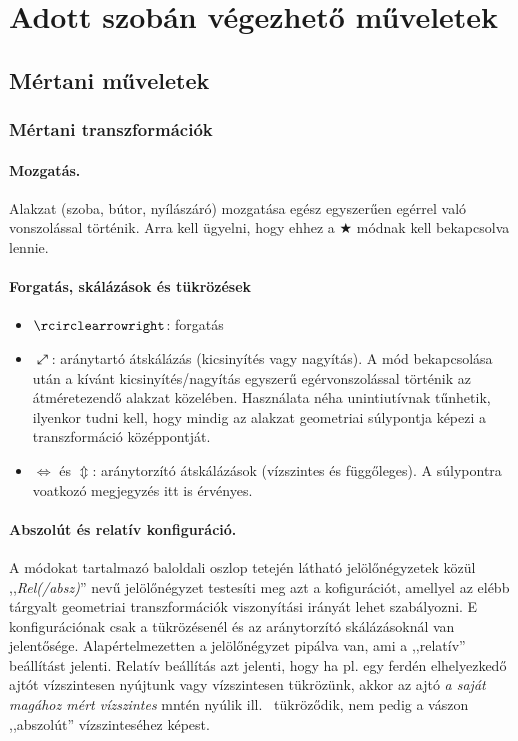 \documentclass{article}
\begin{document}
{	\section{Adott szobán végezhető műveletek}
	\subsection{Mértani műveletek}
	\subsubsection{Mértani transzformációk}
	\paragraph{Mozgatás.} Alakzat (szoba, bútor, nyílászáró) mozgatása egész egyszerűen egérrel való vonszolással történik. Arra kell ügyelni, hogy ehhez a $\bigstar$ módnak kell bekapcsolva lennie.
	\paragraph{Forgatás, skálázások és tükrözések}
	\begin{itemize}
		\item $\rcirclearrowright$: forgatás
		\item $\neswarrow$: aránytartó átskálázás (kicsinyítés vagy nagyítás). A mód bekapcsolása után a kívánt kicsinyítés/nagyítás egyszerű egérvonszolással történik az átméretezendő alakzat közelében. Használata néha unintiutívnak tűnhetik, ilyenkor tudni kell, hogy mindig az alakzat geometriai súlypontja képezi a transzformáció középpontját.
		\item $\Leftrightarrow$ és $\Updownarrow$: aránytorzító átskálázások (vízszintes és függőleges). A súlypontra voatkozó megjegyzés itt is érvényes.
	\end{itemize}
	\paragraph{Abszolút és relatív konfiguráció.} A módokat tartalmazó baloldali oszlop tetején látható jelölőnégyzetek közül ,,\emph{Rel(/absz)}'' nevű jelölőnégyzet testesíti meg azt a kofigurációt, amellyel az elébb tárgyalt geometriai transzformációk viszonyítási irányát lehet szabályozni. E konfigurációnak csak a tükrözésenél és az aránytorzító skálázásoknál van jelentősége. Alapértelmezetten a jelölőnégyzet pipálva van, ami a ,,relatív'' beállítást jelenti. Relatív beállítás azt jelenti, hogy ha pl. egy ferdén elhelyezkedő ajtót vízszintesen nyújtunk vagy vízszintesen tükrözünk, akkor az ajtó \emph{a saját magához mért vízszintes} mntén nyúlik ill.~ tükröződik, nem pedig a vászon ,,abszolút'' vízszinteséhez képest.
}
\end{document}
